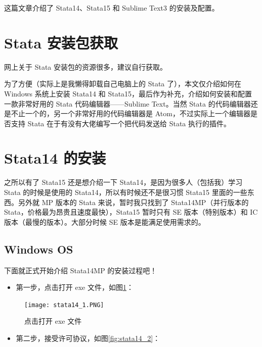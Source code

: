 \documentclass[cn,fancy,blue,11pt]{elegantbook}
\begin{document}
这篇文章介绍了 Stata14、Stata15 和 Sublime Text3 的安装及配置。

\hypertarget{stata-}{%
\section{Stata 安装包获取}\label{stata-}}

网上关于 Stata 安装包的资源很多，建议自行获取。

为了方便（实际上是我懒得卸载自己电脑上的 Stata 了），本文仅介绍如何在 Windows 系统上安装 Stata14 和 Stata15，最后作为补充，介绍如何安装和配置一款非常好用的 Stata 代码编辑器------Sublime Text。当然 Stata 的代码编辑器还是不止一个的，另一个非常好用的代码编辑器是 Atom，不过实际上一个编辑器是否支持 Stata 在于有没有大佬编写一个把代码发送给 Stata 执行的插件。

\hypertarget{stata14-}{%
\section{Stata14 的安装}\label{stata14-}}

之所以有了 Stata15 还是想介绍一下 Stata14，是因为很多人（包括我）学习 Stata 的时候是使用的 Stata14，所以有时候还不是很习惯 Stata15 里面的一些东西。另外就 MP 版本的 Stata 来说，暂时我只找到了 Stata14MP（并行版本的 Stata，价格最为昂贵且速度最快），Stata15 暂时只有 SE 版本（特别版本）和 IC 版本（最慢的版本）。大部分时候 SE 版本是能满足使用需求的。

\hypertarget{windows-os}{%
\subsection{Windows OS}\label{windows-os}}

下面就正式开始介绍 Stata14MP 的安装过程吧！

\begin{itemize}
\item
  第一步，点击打开 exe 文件，如图\ref{fig:stata14_1}：
\end{itemize}

\begin{figure}[htbp]
  \centering
  \texttt{[image: stata14\_1.PNG]}
  \caption{点击打开 exe 文件}
  \label{fig:stata14_1}
\end{figure}

\begin{itemize}
\item
  第二步，接受许可协议，如图\ref{fig:stata14_2}：
\end{itemize}
\end{document}
